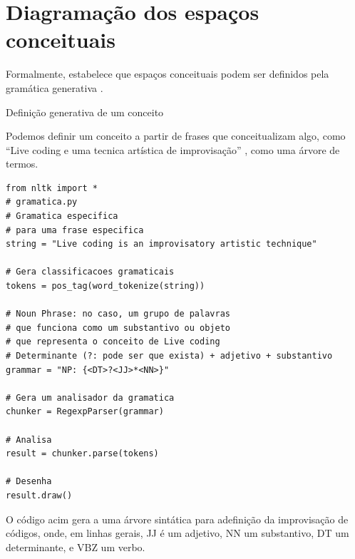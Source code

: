 \section{Diagramação dos espaços conceituais}\label{sec:diagrama}

\newcommand{\csfeq}[2]{
\mathcal{#1}_\emph{#2}
}

\newcommand{\unionspaces}[6]{
\csfeq{#1}{#2} = \csfeq{#3}{#4} \bigcap \csfeq{#5}{#6}
}

\newcommand{\listspaces}[9]{
\csfeq{#1}{#2}~=~[\csfeq{#3}{#2},~\csfeq{#4}{#2},~\csfeq{#5}{#2},~\csfeq{#6}{#2},~\csfeq{#7}{#2},~\csfeq{#8}{#2},~\csfeq{#9}{#2}
}

Formalmente,  estabelece que espaços conceituais podem ser definidos pela gramática generativa .

\begin{example}{Definição generativa de um conceito}\label{ex:generativo}

Podemos definir um conceito a partir de frases que conceitualizam algo, como ``Live coding e uma tecnica artística de improvisação'' , como uma árvore de termos.

\begin{verbatim}
from nltk import *
# gramatica.py
# Gramatica especifica 
# para uma frase especifica
string = "Live coding is an improvisatory artistic technique"

# Gera classificacoes gramaticais
tokens = pos_tag(word_tokenize(string))

# Noun Phrase: no caso, um grupo de palavras
# que funciona como um substantivo ou objeto
# que representa o conceito de Live coding
# Determinante (?: pode ser que exista) + adjetivo + substantivo
grammar = "NP: {<DT>?<JJ>*<NN>}"

# Gera um analisador da gramatica
chunker = RegexpParser(grammar)

# Analisa
result = chunker.parse(tokens)

# Desenha
result.draw()
\end{verbatim}

O código acim gera a uma árvore sintática para adefinição da improvisação de códigos, onde, em linhas gerais, JJ é um adjetivo, NN um substantivo, DT um determinante, e VBZ um verbo.


\end{example}


